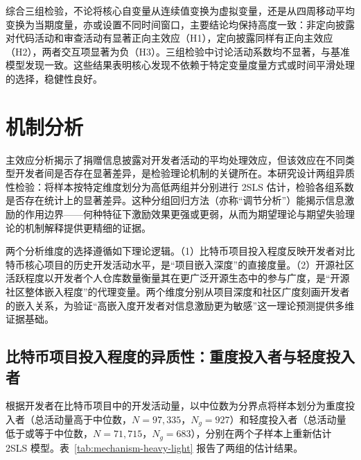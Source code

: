 综合三组检验，不论将核心自变量从连续值变换为虚拟变量，还是从四周移动平均变换为当期度量，亦或设置不同时间窗口，主要结论均保持高度一致：非定向披露对代码活动和审查活动有显著正向主效应（H1），定向披露同样有正向主效应（H2），两者交互项显著为负（H3）。三组检验中讨论活动系数均不显著，与基准模型发现一致。这些结果表明核心发现不依赖于特定变量度量方式或时间平滑处理的选择，稳健性良好。

\section{机制分析}
\label{sec:mechanism-1}

主效应分析揭示了捐赠信息披露对开发者活动的平均处理效应，但该效应在不同类型开发者间是否存在显著差异，是检验理论机制的关键所在。本研究设计两组异质性检验：将样本按特定维度划分为高低两组并分别进行 2SLS 估计，检验各组系数是否存在统计上的显著差异。这种分组回归方法（亦称“调节分析”）能揭示信息激励的作用边界——何种特征下激励效果更强或更弱，从而为期望理论与期望失验理论的机制解释提供更精细的证据。

两个分析维度的选择遵循如下理论逻辑。（1）比特币项目投入程度反映开发者对比特币核心项目的历史开发活动水平，是“项目嵌入深度”的直接度量。（2）开源社区活跃程度以开发者个人仓库数量衡量其在更广泛开源生态中的参与广度，是“开源社区整体嵌入程度”的代理变量。两个维度分别从项目深度和社区广度刻画开发者的嵌入关系，为验证“高嵌入度开发者对信息激励更为敏感”这一理论预测提供多维证据基础。

\subsection{比特币项目投入程度的异质性：重度投入者与轻度投入者}

根据开发者在比特币项目中的开发活动量，以中位数为分界点将样本划分为重度投入者（总活动量高于中位数，$N = 97{,}335$，$N_g = 927$）和轻度投入者（总活动量低于或等于中位数，$N = 71{,}715$，$N_g = 683$），分别在两个子样本上重新估计 2SLS 模型。表~\ref{tab:mechanism-heavy-light} 报告了两组的估计结果。

